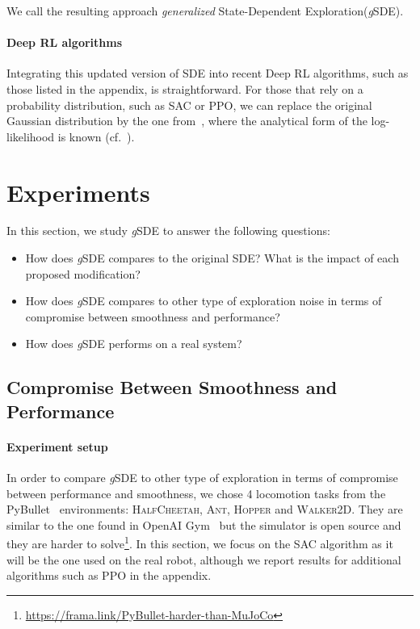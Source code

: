 \documentclass{article}
\newcommand{\cf}{cf.}
\newcommand{\sde}{State-Dependent Exploration\xspace}
\newcommand{\SDE}{\textsc{SDE}\xspace}
\newcommand{\ourSDE}{\textit{g}\textsc{SDE}\xspace}
\newcommand{\ppo}{\textsc{PPO}\xspace}
\newcommand{\sac}{\textsc{SAC}\xspace}
\newcommand{\hc}{\textsc{HalfCheetah}\xspace}
\newcommand{\hopper}{\textsc{Hopper}\xspace}
\newcommand{\ant}{\textsc{Ant}\xspace}
\newcommand{\walker}{\textsc{Walker2D}\xspace}
\begin{document}
We call the resulting approach \textit{generalized} \sde (\ourSDE).

\paragraph{Deep RL algorithms}
Integrating this updated version of \SDE into recent Deep RL algorithms, such as those listed in the appendix,
is straightforward. For those that rely on a probability distribution, such as \sac or \ppo, we can replace the original Gaussian distribution by the one from~, where the analytical form of the log-likelihood is known (\cf~).




\section{Experiments}
\label{sec:experiments}

In this section, we study \ourSDE to answer the following questions:
\begin{itemize}
  \item How does \ourSDE compares to the original \SDE? What is the impact of each proposed modification?
  \item How does \ourSDE compares to other type of exploration noise in terms of compromise between smoothness and performance?
  \item How does \ourSDE performs on a real system?
\end{itemize}



\subsection{Compromise Between Smoothness and Performance}
\label{sec:pybullet-envs}


\paragraph{Experiment setup}

In order to compare \ourSDE to other type of exploration in terms of compromise between performance and smoothness,
we chose 4 locomotion tasks from the PyBullet~\citep{coumans2019bullet} environments: \hc, \ant, \hopper and \walker.
They are similar to the one found in OpenAI Gym~\citep{brockman2016openai} but the simulator is open source and they are harder to solve\footnote{\url{https://frama.link/PyBullet-harder-than-MuJoCo}}.
In this section, we focus on the \sac algorithm as it will be the one used on the real robot, although we report results for additional algorithms such as \ppo in the appendix.
\end{document}
